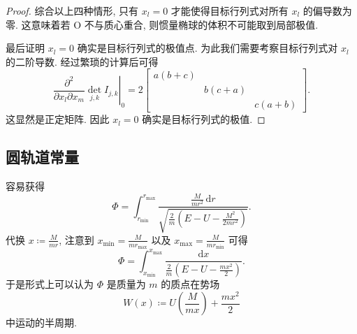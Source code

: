 \documentclass{article}
\begin{document}
\begin{proof}
综合以上四种情形, 只有 $x_l=0$ 才能使得目标行列式对所有 $x_l$ 的偏导数为零.
这意味着若 O 不与质心重合, 则惯量椭球的体积不可能取到局部极值.

最后证明 $x_l=0$ 确实是目标行列式的极值点.
为此我们需要考察目标行列式对 $x_l$ 的二阶导数.
经过繁琐的计算后可得
\begin{equation}
	\left.\frac{\partial^2}{\partial x_l\partial x_m}\det_{j,k}I_{j,k}\right|_0
	=2\left[\begin{matrix}a\left(b+c\right)\\&b\left(c+a\right)\\&&c\left(a+b\right)\end{matrix}\right].
\end{equation}
这显然是正定矩阵. 因此 $x_l=0$ 确实是目标行列式的极值.
\end{proof}

\subsection{圆轨道常量}

容易获得
\begin{equation}
	\Phi=\int_{r_\mathrm{min}}^{r_\mathrm{max}}\frac{\frac{M}{mr^2}\,\mathrm dr}{\sqrt{\frac2m\left(E-U-\frac{M^2}{2mr^2}\right)}}.
\end{equation}
代换 $x\coloneqq\frac{M}{mr}$, 注意到 $x_{\mathrm{min}}=\frac{M}{mr_{\mathrm{max}}}$ 以及 $x_{\mathrm{max}}=\frac{M}{mr_{\mathrm{min}}}$ 可得
\begin{equation}
	\Phi=\int_{x_{\mathrm{min}}}^{x_{\mathrm{max}}}\frac{\mathrm dx}{\frac2m\left(E-U-\frac{mx^2}2\right)}.
\end{equation}
于是形式上可以认为 $\Phi$ 是质量为 $m$ 的质点在势场
\begin{equation}
	W\!\left(x\right)\coloneqq U\!\left(\frac M{mx}\right)+\frac{mx^2}2
\end{equation}
中运动的半周期.
\end{document}
